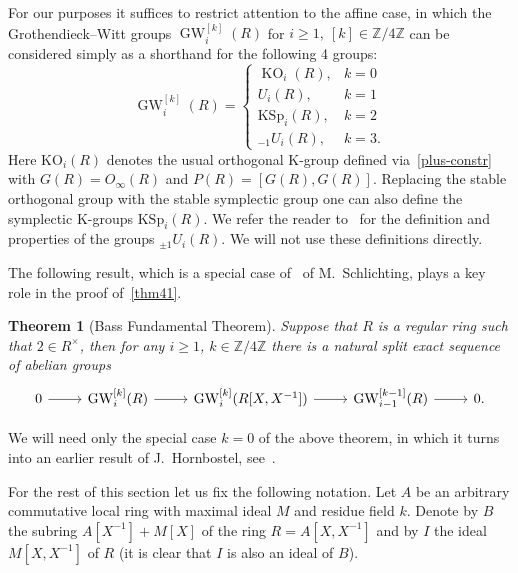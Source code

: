 \documentclass[oneside, 8pt]{amsart}
\newtheorem{externaltheorem}[lemma]{Theorem}
\theoremstyle{remark}
\theoremstyle{definition}
\numberwithin{lemma}{section}
\numberwithin{prop}{section}
\numberwithin{corollary}{section}
\numberwithin{externaltheorem}{section}
\DeclareMathOperator{\KO}{KO}
\DeclareMathOperator{\GW}{GW}
\newcommand{\ZZ}{\mathbb{Z}}
\numberwithin{equation}{section}
\begin{document}
For our purposes it suffices to restrict attention to the affine case, in which  the Grothendieck--Witt groups $\GW_i^{[k]}(R)$ for $i \geq 1,\ [k] \in \ZZ/4\ZZ$ can be considered simply as a shorthand for the following 4 groups:
\begin{equation} \label{GW-concrete} \GW_i^{[k]}(R) = \left\{\begin{array}{ll} \KO_i(R), & k = 0 \\ U_i(R), & k = 1 \\ \mathrm{KSp}_i(R), & k = 2 \\ {}_{-1}\!U_i(R), & k = 3. \end{array}\right. \end{equation}
Here $\mathrm{KO}_i(R)$ denotes the usual orthogonal K-group defined via~\eqref{plus-constr} with $G(R) = O_\infty(R)$ and $P(R) = [G(R), G(R)]$.
Replacing the stable orthogonal group with the stable symplectic group one can also define the symplectic K-groups $\mathrm{KSp}_i(R)$.
We refer the reader to~\cite{Ka80} for the definition and properties of the groups ${}_{\pm 1}\!U_i(R)$. We will not use these definitions directly.

The following result, which is a special case of~\cite[Theorem~9.13]{Sch16} of M.~Schlichting, plays a key role in the proof of~\cref{thm41}.
\begin{externaltheorem}[Bass Fundamental Theorem]\label{bass-ft} Suppose that $R$ is a regular ring such that $2 \in R^\times$, 
then for any $i\geq 1$, $k\in \ZZ/4\ZZ$ there is a natural split exact sequence of abelian groups 
\[ \begin{tikzcd} 0 \arrow{r} & \GW_i^{[k]}(R) \arrow{r} & \GW_i^{[k]}(R[X, X^{-1}]) \arrow{r} & \GW_{i-1}^{[k-1]}(R) \arrow{r} & 0. \end{tikzcd} \] \end{externaltheorem}
We will need only the special case $k=0$ of the above theorem, in which it turns into an earlier result of J.~Hornbostel, see~\cite[Corollary~5.3]{Ho05}.

For the rest of this section let us fix the following notation.
Let $A$ be an arbitrary commutative local ring with maximal ideal $M$ and residue field $k$.
Denote by $B$ the subring $A[X^{-1}] + M[X]$ of the ring $R = A[X, X^{-1}]$ and
by $I$ the ideal $M[X, X^{-1}]$ of $R$ (it is clear that $I$ is also an ideal of $B$).
\end{document}
